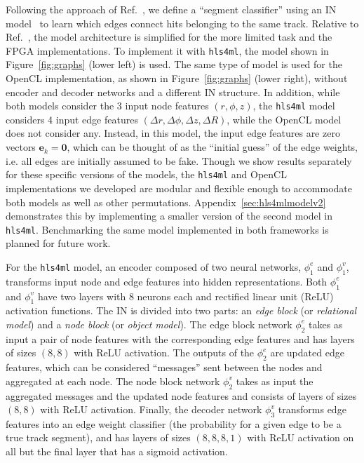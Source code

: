 \documentclass{article}
\newcommand{\hlsfml}{\texttt{hls4ml}\xspace}
\begin{document}
Following the approach of Ref.~\cite{Farrell:2018cjr,Ju:2020xty}, we define a ``segment classifier'' using an IN model~\cite{Battaglia:2016jem,battaglia2018relational} to learn which edges connect hits belonging to the same track.
Relative to Ref.~\cite{Ju:2020xty}, the model architecture is simplified for the more limited task and the FPGA implementations. 
To implement it with \hlsfml, the model shown in Figure~\ref{fig:graphs} (lower left) is used.
The same type of model is used for the OpenCL implementation, as shown in Figure~\ref{fig:graphs} (lower right), without encoder and decoder networks and a different IN structure.
In addition, while both models consider the 3 input node features $(r, \phi, z)$, the \hlsfml model considers 4 input edge features $(\Delta r, \Delta\phi, \Delta z, \Delta R)$, while the OpenCL model does not consider any.
Instead, in this model, the input edge features are zero vectors $\boldsymbol{e}_k = \boldsymbol{0}$, which can be thought of as the ``initial guess'' of the edge weights, i.e. all edges are initially assumed to be fake.
Though we show results separately for these specific versions of the models, the \hlsfml and OpenCL implementations we developed are modular and flexible enough to accommodate both models as well as other permutations.
Appendix~\ref{sec:hls4mlmodelv2} demonstrates this by implementing a smaller version of the second model in \hlsfml.
Benchmarking the same model implemented in both frameworks is planned for future work.


For the \hlsfml model, an encoder composed of two neural networks, $\phi_1^e$ and $\phi_1^v$, transforms input node and edge features into hidden representations.
Both $\phi_1^e$ and $\phi_1^v$ have two layers with 8 neurons each and rectified linear unit (ReLU)~\cite{relu1,relu2} activation functions.
The IN is divided into two parts: an \emph{edge block} (or \emph{relational model}) and a \emph{node block} (or \emph{object model}).
The edge block network $\phi_2^e$ takes as input a pair of node features with the corresponding edge features and has layers of sizes $(8, 8)$ with ReLU activation.
The outputs of the $\phi_2^e$ are updated edge features, which can be considered ``messages'' sent between the nodes and aggregated at each node.
The node block network $\phi_2^v$ takes as input the aggregated messages and the updated node features and consists of layers of sizes $(8, 8)$ with ReLU activation.
Finally, the decoder network $\phi_3^v$ transforms edge features into an edge weight classifier (the probability for a given edge to be a true track segment), and has layers of sizes $(8, 8, 8, 1)$ with ReLU activation on all but the final layer that has a sigmoid activation.
\end{document}
